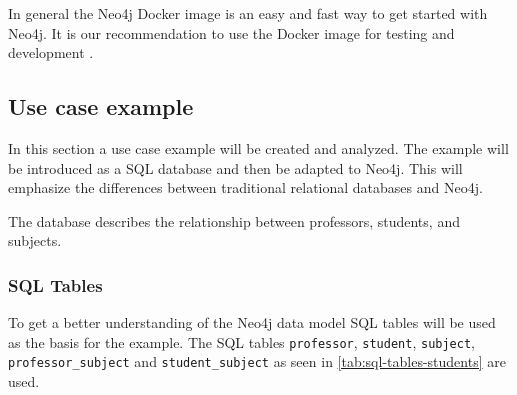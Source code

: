 In general the Neo4j Docker image is an easy and fast way to get started with
Neo4j. It is our recommendation to use the Docker image for testing and
development \parencite{neo4j:docker}.

\subsection{Use case example}

In this section a use case example will be created and analyzed. The example
will be introduced as a SQL database and then be adapted to Neo4j. This will
emphasize the differences between traditional relational databases and Neo4j.

The database describes the relationship between professors, students, and
subjects.
\subsubsection{SQL Tables}
To get a better understanding of the Neo4j data model SQL tables will be used as
the basis for the example. The SQL tables \texttt{professor}, \texttt{student}, \texttt{subject},
\texttt{professor\_subject} and \texttt{student\_subject} as seen in \autoref{tab:sql-tables-students} are used.

